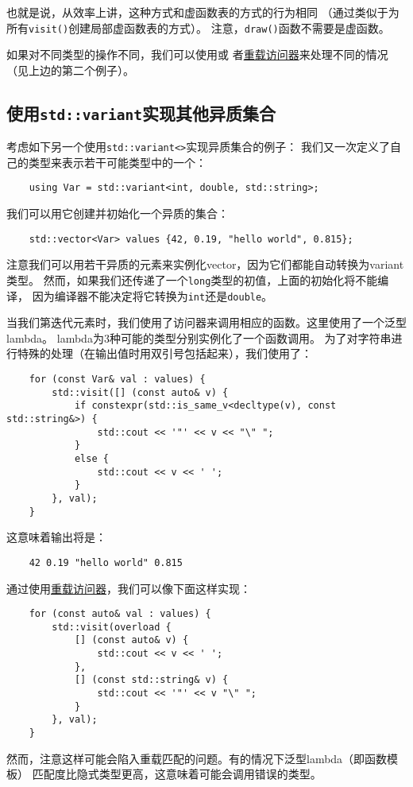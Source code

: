 也就是说，从效率上讲，这种方式和虚函数表的方式的行为相同
（通过类似于为所有\texttt{visit()}创建局部虚函数表的方式）。
注意，\texttt{draw()}函数不需要是虚函数。

如果对不同类型的操作不同，我们可以使用或
者\hyperref[ch16.3.3.4]{重载访问器}来处理不同的情况（见上边的第二个例子）。

\subsection{使用\texttt{std::variant}实现其他异质集合}
考虑如下另一个使用\texttt{std::variant<>}实现异质集合的例子：
我们又一次定义了自己的类型来表示若干可能类型中的一个：
\begin{lstlisting}
    using Var = std::variant<int, double, std::string>;
\end{lstlisting}
我们可以用它创建并初始化一个异质的集合：
\begin{lstlisting}
    std::vector<Var> values {42, 0.19, "hello world", 0.815};
\end{lstlisting}
注意我们可以用若干异质的元素来实例化vector，因为它们都能自动转换为variant类型。
然而，如果我们还传递了一个\texttt{long}类型的初值，上面的初始化将不能编译，
因为编译器不能决定将它转换为\texttt{int}还是\texttt{double}。

当我们第迭代元素时，我们使用了访问器来调用相应的函数。这里使用了一个泛型lambda。
lambda为3种可能的类型分别实例化了一个函数调用。
为了对字符串进行特殊的处理（在输出值时用双引号包括起来），我们使用了：
\begin{lstlisting}
    for (const Var& val : values) {
        std::visit([] (const auto& v) {
            if constexpr(std::is_same_v<decltype(v), const std::string&>) {
                std::cout << '"' << v << "\" ";
            }
            else {
                std::cout << v << ' ';
            }
        }, val);
    }
\end{lstlisting}
这意味着输出将是：
\begin{lstlisting}
    42 0.19 "hello world" 0.815
\end{lstlisting}
通过使用\hyperref[ch16.3.3.4]{重载访问器}，我们可以像下面这样实现：
\begin{lstlisting}
    for (const auto& val : values) {
        std::visit(overload {
            [] (const auto& v) {
                std::cout << v << ' ';
            },
            [] (const std::string& v) {
                std::cout << '"' << v "\" ";
            }
        }, val);
    }
\end{lstlisting}
然而，注意这样可能会陷入重载匹配的问题。有的情况下泛型lambda（即函数模板）
匹配度比隐式类型更高，这意味着可能会调用错误的类型。

